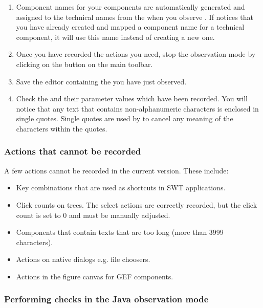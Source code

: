 \begin{enumerate}
\item Component names for your components are automatically generated and assigned to the technical names from the \gdaut{} when you observe \gdsteps{}. If \app{} notices that you have already created and mapped a component name for a technical component, it will use this name instead of creating a new one. 
\item Once you have recorded the actions you need, stop the observation mode by clicking on the  button 
on the main toolbar.
\item Save the \gdcase{} editor containing the \gdsteps{} you have just observed. 
\item Check the \gdsteps{} and their parameter values which have been recorded. 
You will notice that any text that contains non-alphanumeric characters is enclosed in single quotes. Single quotes are used by \app{} to cancel any meaning of the characters within the quotes. 
\end{enumerate}

\subsubsection{Actions that cannot be recorded}
A few actions cannot be recorded in the current version. These include:
\begin{itemize}
\item Key combinations that are used as shortcuts in SWT applications.
\item Click counts on trees. The select actions are correctly recorded, but the click count is set to 0 and must be manually adjusted. 
\item Components that contain texts that are too long (more than 3999 characters). 
\item Actions on native dialogs e.g. file choosers. 
\item Actions in the figure canvas for GEF components. 
\end{itemize}

\subsubsection{Performing checks in the Java observation mode}
\label{TasksObsCheckJava}

